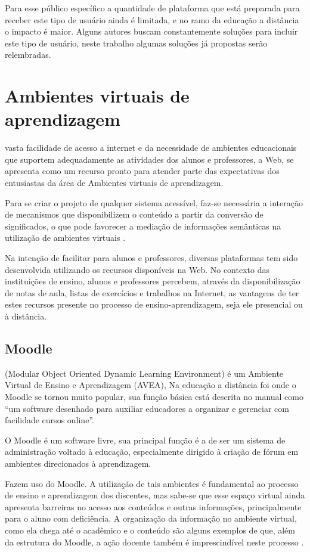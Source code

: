 \documentclass[12pt,journal,compsoc]{IEEEtran}
\begin{document}
Para esse público específico a quantidade de plataforma que está preparada para receber este tipo de usuário ainda é limitada, e no 
ramo da educação a distância o impacto é maior.
Alguns autores buscam constantemente soluções para incluir este tipo de usuário, neste trabalho algumas soluções já propostas
serão relembradas.

\section{Ambientes virtuais de aprendizagem}
 vasta facilidade de acesso a internet e da necessidade de ambientes educacionais que suportem 
adequadamente as atividades dos alunos e professores, a Web, se apresenta como um recurso pronto para atender 
parte das expectativas dos entusiastas da área de Ambientes virtuais de aprendizagem.

Para se criar o projeto de qualquer sistema acessível, faz-se necessária a interação de mecanismos que disponibilizem o 
conteúdo a partir da conversão de significados, o que pode favorecer a mediação de informações semânticas na utilização 
de ambientes virtuais \cite{Paper2008}.

Na intenção de facilitar para alunos e professores, diversas plataformas tem sido desenvolvida utilizando os recursos 
disponíveis na Web. No contexto das instituições de ensino, alunos e professores percebem, através da disponibilização 
de notas de aula, listas de exercícios e trabalhos na Internet, as vantagens de ter estes recursos presente no processo 
de ensino-aprendizagem, seja ele presencial ou à distância.

\subsection{Moodle}
 (Modular Object Oriented Dynamic Learning Environment) é um Ambiente Virtual de Ensino e Aprendizagem (AVEA), Na educação a distância foi onde o Moodle se tornou muito popular, sua função básica está descrita no manual como “um software desenhado para auxiliar educadores a organizar e gerenciar com facilidade cursos online”. 

O Moodle é um software livre, sua principal função é a de ser um sistema de administração voltado à educação, especialmente dirigido à criação de fórum em ambientes direcionados à aprendizagem.

Fazem uso do Moodle. A utilização de tais ambientes é fundamental ao processo de ensino e 
aprendizagem dos discentes, mas sabe-se que esse espaço virtual ainda apresenta barreiras no acesso aos conteúdos e 
outras informações, principalmente para o aluno com deficiência. A organização da informação no ambiente virtual, como 
ela chega até o acadêmico e o conteúdo são alguns exemplos de que, além da estrutura do Moodle, a ação docente 
também é imprescindível neste processo \cite{FIALHO}.
\end{document}
